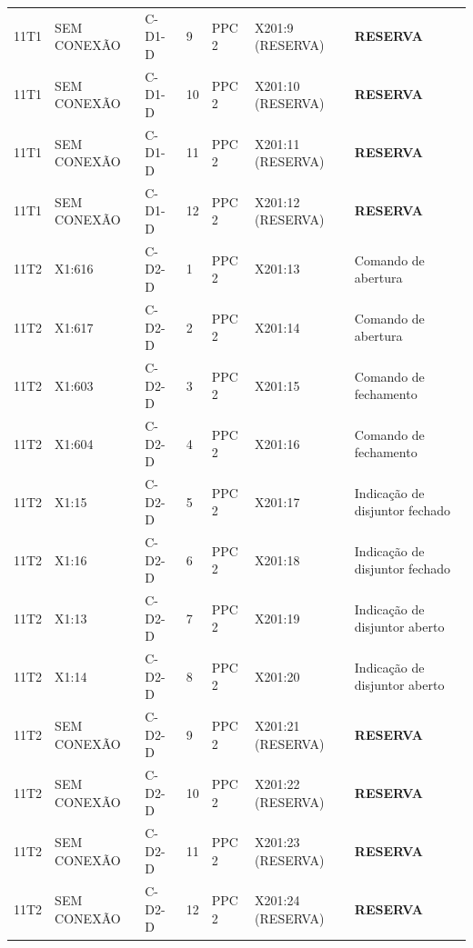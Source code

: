 \documentclass[11pt,a4paper]{article}
\newcommand{\res}{\textbf{RESERVA}}
\begin{document}
\begin{landscape}
\begin{longtable}{@{}L{2.5cm}L{2.4cm}L{2.8cm}L{0.85cm}L{2.4cm}L{2.6cm}L{9.5cm}@{}}
11T1 & SEM CONEXÃO & C-D1-D & 9 & PPC 2 & X201:9 (RESERVA) & \res{}\\
11T1 & SEM CONEXÃO & C-D1-D & 10 & PPC 2 & X201:10 (RESERVA) & \res{}\\
11T1 & SEM CONEXÃO & C-D1-D & 11 & PPC 2 & X201:11 (RESERVA) & \res{}\\
11T1 & SEM CONEXÃO & C-D1-D & 12 & PPC 2 & X201:12 (RESERVA) & \res{}\\
\pagebreak
11T2 & X1:616 & C-D2-D & 1 & PPC 2 & X201:13 & Comando de abertura\\
11T2 & X1:617 & C-D2-D & 2 & PPC 2 & X201:14 & Comando de abertura\\
11T2 & X1:603 & C-D2-D & 3 & PPC 2 & X201:15 & Comando de fechamento\\
11T2 & X1:604 & C-D2-D & 4 & PPC 2 & X201:16 & Comando de fechamento\\
11T2 & X1:15 & C-D2-D & 5 & PPC 2 & X201:17 & Indicação de disjuntor fechado\\
11T2 & X1:16 & C-D2-D & 6 & PPC 2 & X201:18 & Indicação de disjuntor fechado\\
11T2 & X1:13 & C-D2-D & 7 & PPC 2 & X201:19 & Indicação de disjuntor aberto\\
11T2 & X1:14 & C-D2-D & 8 & PPC 2 & X201:20 & Indicação de disjuntor aberto\\
11T2 & SEM CONEXÃO & C-D2-D & 9 & PPC 2 & X201:21 (RESERVA) & \res{}\\
11T2 & SEM CONEXÃO & C-D2-D & 10 & PPC 2 & X201:22 (RESERVA) & \res{}\\
11T2 & SEM CONEXÃO & C-D2-D & 11 & PPC 2 & X201:23 (RESERVA) & \res{}\\
11T2 & SEM CONEXÃO & C-D2-D & 12 & PPC 2 & X201:24 (RESERVA) & \res{}\\
\end{longtable}\endgroup\end{landscape}
\end{document}
